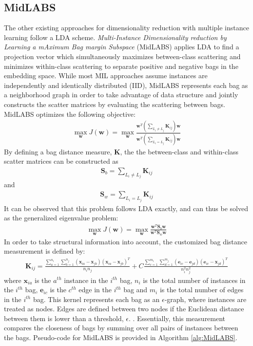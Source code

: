 \subsection{MidLABS} \label{sec:MidLABS}
The other existing approaches for dimensionality reduction with multiple instance learning follow a LDA scheme.  \textit{Multi-Instance Dimensionality reduction by Learning a mAximum Bag margin Subspace} (MidLABS) \citep{Ping2010MILDRMaxMargin} applies LDA to find a projection vector which simultaneously maximizes between-class scattering and minimizes within-class scattering to separate positive and negative bags in the embedding space.  While most MIL approaches assume instances are independently and identically distributed (IID), MidLABS represents each bag as a neighborhood graph in order to take advantage of data structure and jointly constructs  the scatter matrices by evaluating the scattering between bags. MidLABS optimizes the following objective:
\begin{align}
\max_{\bm{w}} J(\bm{w})= \max_{\bm{w}} \frac{\bm{w}^{T}(\sum_{L_{i} \neq L_{j}}\bm{K}_{ij})\bm{w}}{\bm{w}^{T}(\sum_{L_{i} = L_{j}}\bm{K}_{ij})\bm{w}}
\end{align}  
\noindent
By defining a bag distance measure, $\bm{K}$, the the between-class and within-class scatter matrices can be constructed as
\begin{align}
\bm{S}_{b} = \sum_{L_{i} \neq L_{j}}\bm{K}_{ij}
\end{align}
\noindent
and
\begin{align}
\bm{S}_{w} = \sum_{L_{i} = L_{j}}\bm{K}_{ij}
\end{align}
\noindent
It can be observed that this problem follows LDA exactly, and can thus be solved as the generalized eigenvalue problem:
\begin{align}
\max_{\bm{w}} J(\bm{w})= \max_{\bm{w}} \frac{\bm{w}^{T}\bm{S}_{b}\bm{w}}{\bm{w}^{T}\bm{S}_{w}\bm{w}}
\end{align}
\noindent
In order to take structural information into account, the customized bag distance measurement is defined by:
\begin{align}
	\bm{K}_{ij} = \frac{\sum_{a=1}^{n_{i}}\sum_{b=1}^{n_{j}} (\bm{x}_{ia} - \bm{x}_{jb})(\bm{x}_{ia} - \bm{x}_{jb})^{T}  }{n_{i}n_{j}} + C\frac{\sum_{c=1}^{m_{i}}\sum_{d=1}^{m_{j}} (\bm{e}_{ic} - \bm{e}_{jd})(\bm{e}_{ic} - \bm{x}_{jd})^{T}  }{n_{i}^{2}n_{j}^{2}}
\end{align}
\noindent
where $\bm{x}_{ia}$ is the $a^{th}$ instance in the $i^{th}$ bag, $n_i$ is the total number of instances in the $i^{th}$ bag, $\bm{e}_{ic}$ is the $c^{th}$ edge in the $i^{th}$ bag and $m_{i}$ is the total number of edges in the $i^{th}$ bag.  This kernel represents each bag as an $\epsilon$-graph, where instances are treated as nodes.  Edges are defined between two nodes if the Euclidean distance between them is lower than a threshold, $\epsilon$. \citep{Latham2015MIFeatureRankingThesis}.  Essentially, this measurement compares the closeness of bags by summing over all pairs of instances between the bags. Pseudo-code for MidLABS is provided in Algorithm \ref{alg:MidLABS}.

